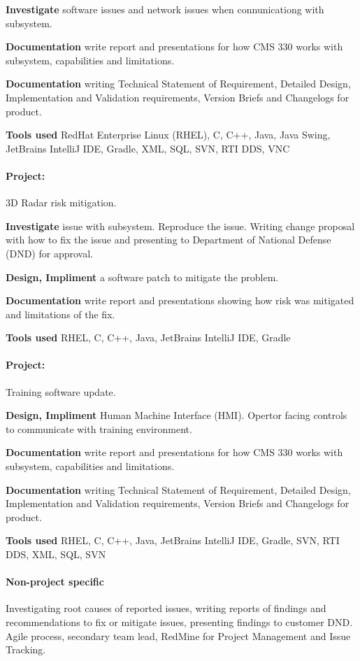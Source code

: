 \documentclass[12pt, twocolumn]{article}
\begin{document}
\textbf{Investigate} software issues and network issues when connunicationg with subsystem.

\textbf{Documentation} write report and presentations for how CMS 330 works with subsystem, capabilities and limitations.

\textbf{Documentation} writing Technical Statement of Requirement, Detailed Design, Implementation and Validation requirements, Version Briefs and Changelogs for product.

\textbf{Tools used} RedHat Enterprise Linux (RHEL), C, C++, Java, Java Swing, JetBrains IntelliJ IDE, Gradle, XML, SQL, SVN, RTI DDS, VNC

\paragraph{Project:} 3D Radar risk mitigation.

\textbf{Investigate} issue with subsystem. Reproduce the issue. Writing change proposal with how to fix the issue and presenting to Department of National Defense (DND) for approval.

\textbf{Design, Impliment} a software patch to mitigate the problem.

\textbf{Documentation} write report and presentations showing how risk was mitigated and limitations of the fix.

\textbf{Tools used} RHEL, C, C++, Java, JetBrains IntelliJ IDE, Gradle

\paragraph{Project:} Training software update.

\textbf{Design, Impliment} Human Machine Interface (HMI). Opertor facing controls to communicate with training environment.

\textbf{Documentation} write report and presentations for how CMS 330 works with subsystem, capabilities and limitations.

\textbf{Documentation} writing Technical Statement of Requirement, Detailed Design, Implementation and Validation requirements, Version Briefs and Changelogs for product.

\textbf{Tools used} RHEL, C, C++, Java, JetBrains IntelliJ IDE, Gradle, SVN, RTI DDS, XML, SQL, SVN

\paragraph{Non-project specific} Investigating root causes of reported issues, writing reports of findings and recommendations to fix or mitigate issues, presenting findings to customer DND. Agile process, secondary team lead, RedMine for Project Management and Issue Tracking.
\end{document}
